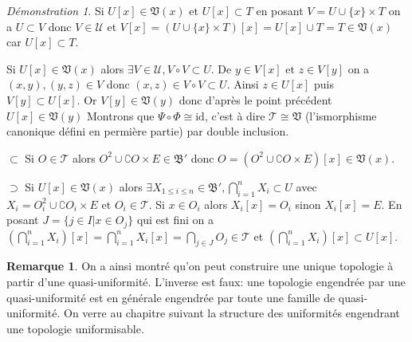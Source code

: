 \documentclass[a4paper, 11pt, french]{book}
\newenvironment{itemise}{\itemize}{\enditemize}
\theoremstyle{plain} %
\theoremstyle{definition} %
\newtheorem{remarque}{Remarque}
\theoremstyle{remark} %
\newtheorem*{demonstration}{Démonstration}
\newcommand{\1}{\mathds{1}}
\newcommand{\id}{\mathrm{id}}
\newcommand{\infegal}{\leqslant}
\newcommand\et{\text{ et }}
\begin{document}
\begin{demonstration}
\begin{itemise}
		\item Si $U[x]\in\mathfrak{V}(x)\et U[x]\subset T$ en posant $V=U\cup\{x\}\times T$ on a $U\subset V$ donc $V\in\mathscr{U}$ et $V[x]=(U\cup\{x\}\times T)[x]=U[x]\cup T=T\in\mathfrak{V}(x)$ car $U[x]\subset T$.
		\item Si $U[x]\in\mathfrak{V}(x)$ alors $\exists V\in\mathscr{U}, V\circ V\subset U$.
		De $y\in V[x]\et z\in V[y]$ on a $(x, y), (y, z)\in V$ donc $(x, z)\in V\circ V\subset U$.
		Ainsi $z\in U[x]$ puis $V[y]\subset U[x]$.
		Or $V[y]\in\mathfrak{V}(y)$ donc d'après le point précédent $U[x]\in\mathfrak{V}(y)$
	\end{itemise}
	Montrons que $\Psi\circ\Phi\cong\id$, c'est à dire $\mathscr{T}\cong\mathfrak{V}$ (l'ismorphisme canonique défini en permière partie) par double inclusion.
	\begin{itemise}
		\item[$\subset$] Si $O\in\mathscr{T}$ alors $O^2\cup\complement O\times E\in\mathfrak{B}'$ donc $O=(O^2\cup\complement O\times E)[x]\in\mathfrak{V}(x)$.
		\item[$\supset$] Si $U[x]\in\mathfrak{V}(x)$ alors $\exists X_{1\infegal i\infegal n}\in\mathfrak{B}', \bigcap_{i=1}^nX_i\subset U$ avec $X_i=O_i^2\cup\complement O_i\times E$ et $O_i\in\mathscr{T}$.
		Si $x\in O_i$ alors $X_i[x]=O_i$ sinon $X_i[x]=E$.
		En posant $J=\{j\in I|x\in O_j\}$ qui est fini on a $(\bigcap_{i=1}^nX_i)[x]=\bigcap_{i=1}^nX_i[x]=\bigcap_{j\in J}O_j\in\mathscr{T}$ et $(\bigcap_{i=1}^nX_i)[x]\subset U[x]$.
	\end{itemise}
\end{demonstration}

\begin{remarque}
	On a ainsi montré qu'on peut construire une unique topologie à partir d'une quasi-uniformité.
	L'inverse est faux: une topologie engendrée par une quasi-uniformité est en générale engendrée par toute une famille de quasi-uniformité.
	On verre au chapitre suivant la structure des uniformités engendrant une topologie uniformisable.
\end{remarque}
\end{document}
